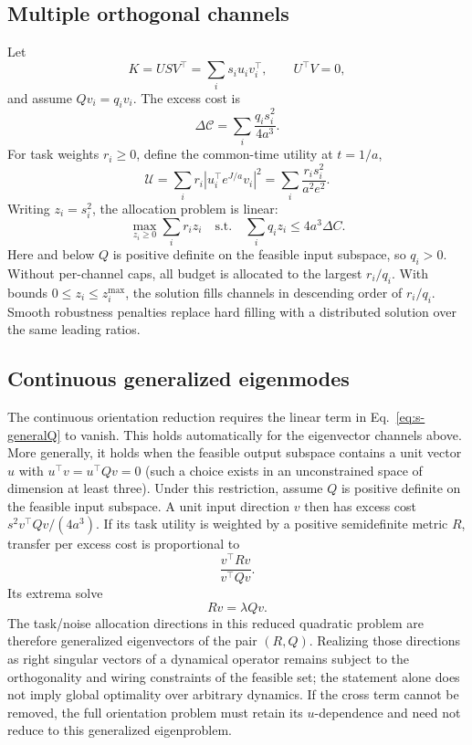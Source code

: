 \documentclass[
  aps,prl,preprint,notitlepage,superscriptaddress,nofootinbib,longbibliography,
  amsmath,amssymb
]{revtex4-2}
\newcommand{\Cnoise}{\mathcal{C}}
\begin{document}
\subsection{Multiple orthogonal channels}

Let
\begin{equation}
K=USV^\top
=\sum_i s_i u_iv_i^\top,
\qquad U^\top V=0,
\end{equation}
and assume $Qv_i=q_iv_i$. The excess cost is
\begin{equation}
\Delta\Cnoise
=\sum_i\frac{q_is_i^2}{4a^3}.
\end{equation}
For task weights $r_i\ge0$, define the common-time utility at $t=1/a$,
\begin{equation}
\mathcal U
=\sum_i r_i\left|u_i^\top e^{J/a}v_i\right|^2
=\sum_i\frac{r_is_i^2}{a^2e^2}.
\end{equation}
Writing $z_i=s_i^2$, the allocation problem is linear:
\begin{equation}
\max_{z_i\ge0}\sum_i r_i z_i
\quad\mathrm{s.t.}\quad
\sum_i q_i z_i\le4a^3\Delta C.
\end{equation}
Here and below $Q$ is positive definite on the feasible input subspace, so
$q_i>0$. Without per-channel caps, all budget is allocated to the largest $r_i/q_i$.
With bounds $0\le z_i\le z_i^{\max}$, the solution fills channels in descending
order of $r_i/q_i$. Smooth robustness penalties replace hard filling with a
distributed solution over the same leading ratios.

\subsection{Continuous generalized eigenmodes}

The continuous orientation reduction requires the linear term in
Eq.~\eqref{eq:s-generalQ} to vanish.  This holds automatically for the
eigenvector channels above.  More generally, it holds when the feasible output
subspace contains a unit vector $u$ with $u^\top v=u^\top Qv=0$ (such a choice
exists in an unconstrained space of dimension at least three).  Under this
restriction, assume $Q$ is positive definite on the feasible input subspace.
A unit input direction $v$ then has excess cost
$s^2v^\top Qv/(4a^3)$.  If its task utility is weighted by a positive
semidefinite metric $R$, transfer per excess cost is proportional to
\begin{equation}
\frac{v^\top Rv}{v^\top Qv}.
\end{equation}
Its extrema solve
\begin{equation}
Rv=\lambda Qv.
\end{equation}
The task/noise allocation directions in this reduced quadratic problem are
therefore generalized eigenvectors of the pair $(R,Q)$.  Realizing those directions as
right singular vectors of a dynamical operator remains subject to the
orthogonality and wiring constraints of the feasible set; the statement alone
does not imply global optimality over arbitrary dynamics.  If the cross term
cannot be removed, the full orientation problem must retain its $u$-dependence
and need not reduce to this generalized eigenproblem.
\end{document}
